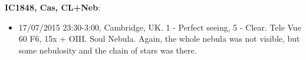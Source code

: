 {\bf IC1848, Cas, CL+Neb}:
\begin{itemize}
\item 17/07/2015 23:30-3:00, Cambridge, UK. 1 - Perfect seeing, 5 - Clear. Tele Vue 60 F6, 15x + OIII. Soul Nebula. Again, the whole nebula was not visible, but some nebulosity and the chain of stars was there.
\end{itemize}
